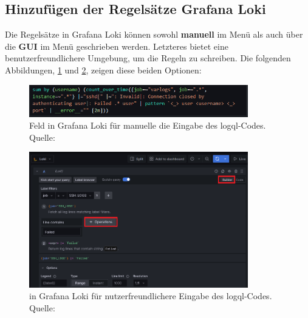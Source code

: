 

\newpage
\subsection{Hinzufügen der Regelsätze Grafana Loki}
Die Regelsätze in Grafana Loki können sowohl \textbf{manuell} im Menü  als auch über die \textbf{\gls{GUI}} im Menü  geschrieben werden. Letzteres bietet eine benutzerfreundlichere Umgebung, um die Regeln zu schreiben. Die folgenden Abbildungen, \ref{fig:Loki_Code} und \ref{fig:Loki_Builder}, zeigen diese beiden Optionen:

\begin{figure}[H]
   \centering
   \includegraphics[width=0.85\textwidth]{assets/manuellerCodeLoki.png}
   \caption[Feld in Grafana Loki für die manuelle die Eingabe des \gls{logql}-Codes]
   {Feld in Grafana Loki für manuelle die Eingabe des \gls{logql}-Codes. \\ Quelle: \citep{VoidQuark_sshlogs}}
   \label{fig:Loki_Code}
   \centering
\end{figure}

\begin{figure}[H]
   \centering
   \includegraphics[width=0.85\textwidth]{assets/klickibuntyGrafana.png}
   \caption[ in Grafana Loki für nutzerfreundlichere Eingabe des \gls{logql}-Codes.]
   { in Grafana Loki für nutzerfreundlichere Eingabe des \gls{logql}-Codes. Quelle: \citep{VoidQuark_sshlogs}}
   \label{fig:Loki_Builder}
   \centering
\end{figure}

